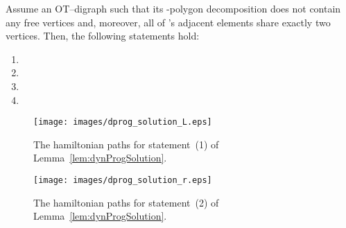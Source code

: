 \documentclass{myllncs-mixalis}
\begin{document}
\begin{lemma}
\label{lem:dynProgSolution} Assume an  OT--digraph  such that
 its  -polygon decomposition
 does not contain any
free vertices and, moreover, all of 's adjacent
elements share exactly two vertices.  Then, the following statements
hold:\vspace*{-.5cm}
\begin{enumerate}[(1)]
\item 
\item 
\item 
\item 
\end{enumerate}
\end{lemma}

\begin{figure}[htb]
  \begin{minipage}{.47\textwidth}
    \centering
    \texttt{[image: images/dprog\_solution\_L.eps]}
    \caption{The hamiltonian paths for statement~(1) of Lemma~\ref{lem:dynProgSolution}.}
    \label{fig:dynProgSolutionLEFT-L}
  \end{minipage}
  \hfill
    \begin{minipage}{.47\textwidth}
    \centering
    \texttt{[image: images/dprog\_solution\_r.eps]}
    \caption{The hamiltonian paths for statement~(2) of Lemma~\ref{lem:dynProgSolution}.}
    \label{fig:dynProgSolutionLEFT-R}
  \end{minipage}
\end{figure}
\end{document}

